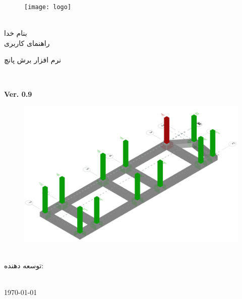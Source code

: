 \thispagestyle{empty}
\begin{figure}[!h]
\centerline{\texttt{[image: logo]}}
\end{figure}
\begin{center}
\vspace{-.8cm}



\\[1cm]
بنام خدا
\\[1cm]
راهنمای کاربری
\\[.8cm]
\begin{Huge}
نرم افزار برش پانچ
\end{Huge}

\\[.5cm]
\begin{latin}
    \textbf{Ver. 0.9}
\end{latin}



\begin{figure}[ht]
    \centering
        \includegraphics[width=\linewidth]{figures/punch}
\end{figure}

\\[1cm]{ توسعه دهنده:}
\\[.3cm]
\textbf{{\large  \developer}}


\\[1.cm]
\today
\end{center}
\newpage
\thispagestyle{empty}
\setcounter{page}{1}
\tableofcontents
\newpage
